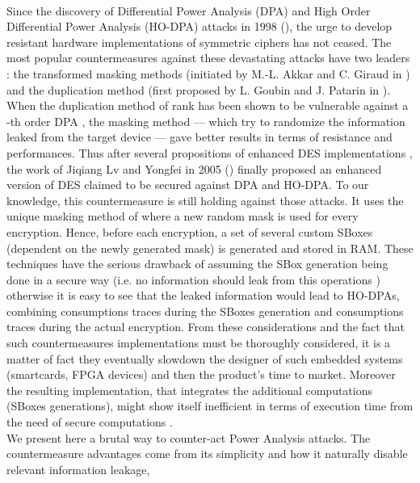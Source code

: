 \documentclass[11pt,a4paper]{article}
\begin{document}
\paragraph{}
Since the discovery of Differential Power Analysis (DPA) and High Order Differential Power Analysis (HO-DPA) attacks in 1998 (\cite{Kocher98}), the urge to develop resistant hardware
implementations of symmetric ciphers has not ceased. The most popular countermeasures against these devastating attacks have two leaders : the transformed masking methods (initiated by
M.-L. Akkar and C. Giraud in \cite{AkkarGiraud01}) and the duplication method (first proposed by L. Goubin and J. Patarin in \cite{GoubinPatarin99}). When the duplication 
method of rank  has been shown to be vulnerable against a -th order DPA \cite{AkkarGoubin03}, the masking method --- which try to randomize the information leaked from the target 
device --- gave better results in terms of resistance and performances. Thus after several propositions of enhanced DES implementations 
\cite{AkkarGiraud01, AkkarGoubin03, AkkarBevanGoubin04} , the work of Jiqiang Lv and Yongfei 
in 2005 (\cite{JiqiangLvYongfei05}) finally proposed an enhanced version of DES
claimed to be secured against DPA and HO-DPA. To our knowledge, this countermeasure is still holding against those attacks. It uses the unique masking method of \cite{AkkarGoubin03} 
where a new random mask is used for every encryption. Hence,
before each encryption, a set of several custom SBoxes (dependent on the newly generated mask) is generated and stored in RAM. These techniques have the serious drawback of assuming the
SBox generation being done in a secure way (i.e. no information should leak from this operations \cite{AkkarGoubin03}) otherwise it is easy to see that the leaked information would lead to 
HO-DPAs, combining consumptions traces during the SBoxes generation and consumptions traces during the actual encryption. 
From these considerations and the fact that such countermeasures implementations must be thoroughly considered, it is a matter of fact they eventually slowdown the designer of such embedded systems (smartcards, FPGA devices) and then the product's time to market. 
Moreover the resulting implementation, that integrates the additional computations (SBoxes generations), might show itself inefficient in terms of execution time 
from the need of secure computations \cite{AkkarGoubin03}. \\
We present here a brutal way to counter-act Power Analysis attacks. The countermeasure advantages come from its simplicity and how it naturally disable relevant information leakage, 
\end{document}
